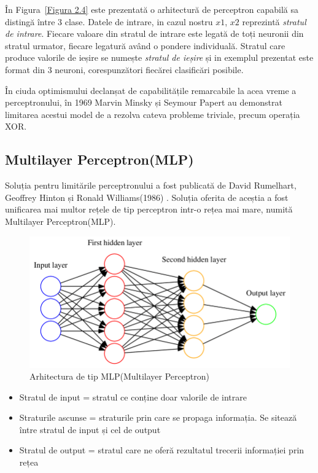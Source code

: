 În Figura~\ref{Figura 2.4} este prezentată o arhitectură de perceptron capabilă sa distingă între 3 clase. Datele de intrare, in cazul nostru $x1$, $x2$ reprezintă \textit{stratul de intrare}. Fiecare valoare din stratul de intrare este legată de toți neuronii din stratul urmator, fiecare legatură având o pondere individuală. Stratul care produce valorile de ieșire se numește \textit{stratul de ieșire} și in exemplul prezentat este format din 3 neuroni, corespunzători fiecărei clasificări posibile. 

În ciuda optimismului declanșat de capabilitățile remarcabile la acea vreme a perceptronului, în 1969 Marvin Minsky și Seymour Papert \cite{minsky1969introduction} au demonstrat limitarea acestui model de a rezolva cateva probleme triviale, precum operația XOR. 

\subsection{Multilayer Perceptron(MLP)}

Soluția pentru limitările perceptronului a fost publicată de David Rumelhart, Geoffrey Hinton și Ronald Williams(1986) \cite{rumelhart1986learning}. Soluția oferita de aceștia a fost unificarea mai multor rețele de tip perceptron intr-o rețea mai mare, numită Multilayer Perceptron(MLP).


\begin{figure}[h]
         \centering 
         \includegraphics[width=.6\linewidth]{images/MLP.png}
         \captionsetup{font=footnotesize}
         \caption{Arhitectura de tip MLP(Multilayer Perceptron) \cite{phdthesis}}
\end{figure}

\begin{itemize}
    \item Stratul de input = stratul ce conține doar valorile de intrare
    \item Straturile ascunse = straturile prin care se propaga informația. Se sitează între stratul de input și cel de output
    \item Stratul de output = stratul care ne oferă rezultatul trecerii informației prin rețea
\end{itemize}

